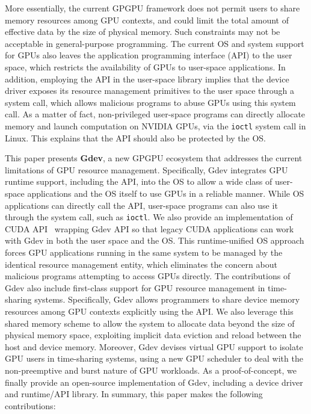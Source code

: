 More essentially, the current GPGPU framework does not permit
users to share memory resources among GPU contexts, and could limit the
total amount of effective data by the size of physical memory.
Such constraints may not be acceptable in general-purpose programming.
The current OS and system support for GPUs also leaves the
application programming interface (API) to the user space, which
restricts the availability of GPUs to user-space applications.
In addition, employing the API in the user-space library implies that
the device driver exposes its resource management primitives to the user
space through a system call, which allows malicious programs to abuse
GPUs using this system call. 
As a matter of fact, non-privileged user-space programs can directly
allocate memory and launch computation on NVIDIA GPUs, via the
\texttt{ioctl} system call in Linux. 
This explains that the API should also be protected by the OS. 

This paper presents \textbf{Gdev}, a new GPGPU ecosystem that addresses
the current limitations of GPU resource management.
Specifically, Gdev integrates GPU runtime support, including the API,
into the OS to allow a wide class of user-space applications and the OS
itself to use GPUs in a reliable manner.
While OS applications can directly call the API, user-space
programs can also use it through the system call, such as
\texttt{ioctl}.
We also provide an implementation of CUDA API~\cite{CUDA40} wrapping
Gdev API so that legacy CUDA applications can work with Gdev in both the
user space and the OS.
This runtime-unified OS approach forces GPU applications running in
the same system to be managed by the identical resource management
entity, which eliminates the concern about malicious programs attempting
to access GPUs directly.
The contributions of Gdev also include first-class support for GPU
resource management in time-sharing systems.
Specifically, Gdev allows programmers to share device memory resources
among GPU contexts explicitly using the API. 
We also leverage this shared memory scheme to allow the system to allocate
data beyond the size of physical memory space, exploiting implicit data
eviction and reload between the host and device memory.
Moreover, Gdev devises virtual GPU support to isolate GPU users in
time-sharing systems, using a new GPU scheduler to deal with the
non-preemptive and burst nature of GPU workloads.
As a proof-of-concept, we finally provide an open-source implementation of Gdev,
including a device driver and runtime/API library.
In summary, this paper makes the following contributions:

